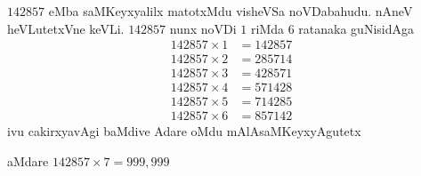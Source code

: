 $142857$ eMba saMKeyxyalilx matotxMdu visheVSa noVDabahudu. nAneV heVLutetxVne keVLi. $142857$ nunx noVDi $1$ riMda $6$ ratanaka guNisidAga 
\begin{align*}
  142857 \times 1 & = 142857\\
  142857 \times 2 & = 285714\\
  142857 \times 3 & = 428571\\
  142857 \times 4 & =571428\\
  142857 \times 5 & =714285\\
  142857 \times 6 & =857142
\end{align*}
ivu cakirxyavAgi baMdive Adare oMdu mAlAsaMKeyxyAgutetx

 aMdare $142857 \times 7 = 999,999$

